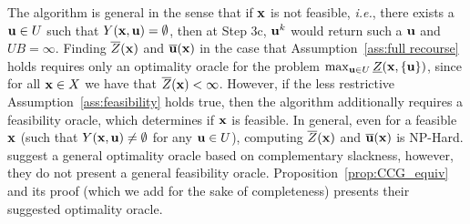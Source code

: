 \documentclass[12pt,x11names]{article}
\theoremstyle{definition}
\newcommand{\ie}{{\em i.e.}, }
\newcommand{\bu}{{\bf u}}
\newcommand{\bx}{{\bf x}}
\begin{document}
The algorithm is general in the sense that if $\bx$ is not feasible, \ie there exists a $\bu\in U$ such that $Y(\bx,\bu)=\emptyset$, then at Step 3c, $\bu^k$ would return such a $\bu$ and $UB=\infty$. Finding $\overline{Z}(\bx)$ and $\overline{\bu}(\bx)$ in the case that Assumption~\ref{ass:full recourse} holds requires only an optimality oracle for the problem $\max_{\bu\in U}\underline{Z}(\bx,\{\bu\})$, since for all $\bx\in X$ we have that $\overline{Z}(\bx)<\infty$. However, if the less restrictive Assumption~\ref{ass:feasibility} holds true, then the algorithm additionally requires a feasibility oracle, which determines if $\bx$ is feasible. In general, even for a feasible $\bx$ (such that $Y(\bx,\bu)\neq \emptyset$ for any $\bu\in U$), computing $\overline{Z}(\bx)$ and $\overline{\bu}(\bx)$ is NP-Hard. \citet{Zeng2013} suggest a general optimality oracle based on complementary slackness, however, they do not present a general feasibility oracle.
Proposition~\ref{prop:CCG_equiv} and its proof (which we add for the sake of completeness) presents their suggested optimality oracle.
\end{document}
